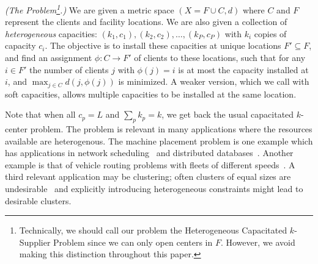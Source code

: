\begin{definition}\emph{(The \mckc Problem\footnote{Technically, we should call our problem the Heterogeneous Capacitated $k$-Supplier Problem since we can only open centers in $F$. However, we avoid making this distinction throughout this paper.}.)}
	We are given a metric space $(X = F\cup C,d)$  where $C$ and $F$ represent the clients and facility locations.%
	We are also given a collection of {\em heterogeneous} capacities: $(k_1,c_1), (k_2,c_2),\ldots, (k_P,c_P)$ with $k_i$ copies of capacity $c_i$.
	The objective is to install these capacities at unique locations $F'\subseteq F$, and find an assignment $\phi:C\to F'$ of clients to these locations,
	such that for any $i\in F'$ the number of clients $j$ with $\phi(j) = i$ is at most the capacity installed at $i$, and $\max_{j\in C} d(j,\phi(j))$ is minimized.
	A weaker version, which we call \mckc  with soft capacities, allows multiple capacities to be installed at the same location.
\end{definition}
\noindent
Note that when all $c_p = L$ and $\sum_p k_p = k$, we get back the usual capacitated $k$-center problem.
The \mckc problem is relevant in many applications where the resources available are heterogenous. The machine placement problem is one example which has applications in network scheduling~\cite{QiuSZ15,ImM15a} and distributed databases~\cite{MorganL77,SKRN15}. Another example is that of  vehicle routing problems with  fleets of different speeds~\cite{GortzMN016}. A third relevant application may be clustering; often clusters of equal sizes are undesirable~\cite{GuhaRS01} and explicitly introducing heterogeneous constraints might lead to desirable clusters.

